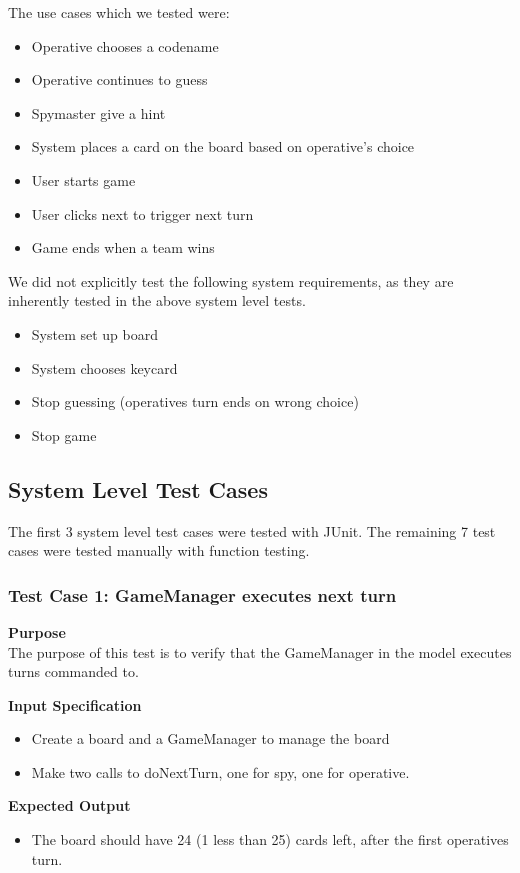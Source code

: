 \documentclass[12pt]{article}
\begin{document}
The use cases which we tested were: 
\begin{itemize}
  \item Operative chooses a codename
  \item Operative continues to guess
  \item Spymaster give a hint
  \item System places a card on the board based on operative's choice
  \item User starts game
  \item User clicks next to trigger next turn
  \item Game ends when a team wins
\end{itemize}

We did not explicitly test the following system requirements, as they are inherently tested in the above system level tests.
\begin{itemize}
  \item System set up board
  \item System chooses keycard
  \item Stop guessing (operatives turn ends on wrong choice)
  \item Stop game
\end{itemize}

\subsection{System Level Test Cases}
The first 3 system level test cases were tested with JUnit. The remaining 7 test cases were tested manually with function testing.

\subsubsection{Test Case 1: GameManager executes next turn} \label{tc:2}

\noindent
{\bf Purpose}\\
The purpose of this test is to verify that the GameManager in the model executes turns commanded to.

\noindent
{\bf Input Specification}
\begin{itemize}
    \item Create a board and a GameManager to manage the board
    \item Make two calls to doNextTurn, one for spy, one for operative.
\end{itemize}

\noindent
{\bf Expected Output}
\begin{itemize}
    \item The board should have 24 (1 less than 25) cards left, after the first operatives turn.
\end{itemize}
\end{document}
